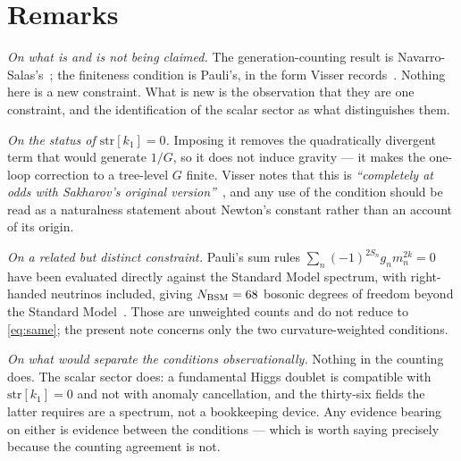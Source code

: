 \documentclass[aps,prd,twocolumn,superscriptaddress,nofootinbib,10pt]{revtex4-2}
\begin{document}
\section{Remarks}\label{sec:remarks}

\emph{On what is and is not being claimed.} The generation-counting result is
Navarro-Salas's~\cite{NavarroSalas2024}; the finiteness condition is Pauli's, in the form Visser
records~\cite{Visser2002}. Nothing here is a new constraint. What is new is the observation that
they are one constraint, and the identification of the scalar sector as what distinguishes them.

\emph{On the status of $\mathrm{str}[k_1] = 0$.} Imposing it removes the quadratically divergent
term that would generate $1/G$, so it does not induce gravity --- it makes the one-loop correction
to a tree-level $G$ finite. Visser notes that this is \emph{``completely at odds with Sakharov's
original version''}~\cite{Visser2002}, and any use of the condition should be read as a naturalness
statement about Newton's constant rather than an account of its origin.

\emph{On a related but distinct constraint.} Pauli's sum rules $\sum_n (-1)^{2S_n} g_n m_n^{2k} = 0$
have been evaluated directly against the Standard Model spectrum, with right-handed neutrinos
included, giving $N_{\rm BSM} = 68$ bosonic degrees of freedom beyond the Standard
Model~\cite{Visser2019}. Those are unweighted counts and do not reduce to \eqref{eq:same}; the
present note concerns only the two curvature-weighted conditions.

\emph{On what would separate the conditions observationally.} Nothing in the counting does. The
scalar sector does: a fundamental Higgs doublet is compatible with $\mathrm{str}[k_1] = 0$ and not
with anomaly cancellation, and the thirty-six fields the latter requires are a spectrum, not a
bookkeeping device. Any evidence bearing on either is evidence between the conditions --- which is
worth saying precisely because the counting agreement is not.

\begin{acknowledgments}
\end{acknowledgments}
\end{document}
